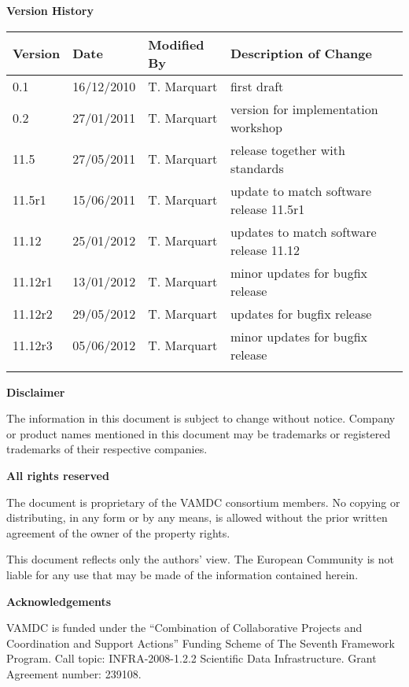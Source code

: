 {\begin{titlepage}
\end{titlepage}

\noindent \textbf{Version History}

\textbf{}

\noindent \begin{tabular}{|l|l|l|l|} 
\hline 
\textbf{Version} & \textbf{Date} & \textbf{Modified By} & \textbf{Description of Change} \\ \hline 
0.1 & 16/12/2010 & T. Marquart & first draft \\ \hline 
0.2 & 27/01/2011 & T. Marquart & version for implementation workshop \\ \hline 
11.5 & 27/05/2011 & T. Marquart & release together with standards \\ \hline 
11.5r1 & 15/06/2011 & T. Marquart & update to match software release 11.5r1 \\ \hline 
11.12 & 25/01/2012 & T. Marquart & updates to match software release 11.12 \\ \hline 
11.12r1 & 13/01/2012 & T. Marquart & minor updates for bugfix release \\ \hline 
11.12r2 & 29/05/2012 & T. Marquart & updates for bugfix release \\ \hline 
11.12r3 & 05/06/2012 & T. Marquart & minor updates for bugfix release \\ \hline 
 &  &  &  \\ \hline 
\end{tabular}

\textbf{}

\noindent \textbf{Disclaimer}

\noindent The information in this document is subject to change without notice. Company or product names mentioned in this document may be trademarks or registered trademarks of their respective companies.


\textbf{}

\noindent \textbf{All rights reserved}

\noindent The document is proprietary of the VAMDC consortium members. No copying or distributing, in any form or by any means, is allowed without the prior written agreement of the owner of the property rights.

\noindent 

\noindent This document reflects only the authors' view. The European Community is not liable for any use that may be made of the information contained herein.

\textbf{}

\noindent \textbf{Acknowledgements}

\noindent VAMDC is funded under the ``Combination of Collaborative Projects and Coordination and  Support Actions'' Funding Scheme of The Seventh Framework Program. Call topic: INFRA-2008-1.2.2 Scientific Data Infrastructure. Grant Agreement number: 239108.

\textbf{}

}
